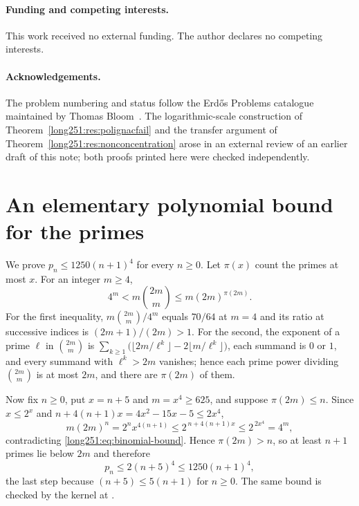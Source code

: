 \documentclass[11pt]{article}
\begin{document}
\paragraph{Funding and competing interests.} This work received no external
funding.  The author declares no competing interests.

\paragraph{Acknowledgements.} The problem numbering and status follow the
Erd\H{o}s Problems catalogue maintained by Thomas Bloom~\cite{erdosproblems}.
The logarithmic-scale construction of Theorem~\ref{long251:res:polignacfail} and the
transfer argument of Theorem~\ref{long251:res:nonconcentration} arose in an external
review of an earlier draft of this note; both proofs printed here were checked
independently.

\appendix
\section{An elementary polynomial bound for the primes}\label{long251:app:prime-bound}

We prove $p_n\le1250(n+1)^4$ for every $n\ge0$.  Let $\pi(x)$ count the primes
at most $x$.  For an integer $m\ge4$,
\begin{equation}\label{long251:eq:binomial-bound}
 4^m<m\binom{2m}{m}\le m(2m)^{\pi(2m)} .
\end{equation}
For the first inequality, $m\binom{2m}{m}/4^{m}$ equals $70/64$ at $m=4$ and
its ratio at successive indices is $(2m+1)/(2m)>1$.  For the second, the
exponent of a prime $\ell$ in $\binom{2m}{m}$ is
$\sum_{k\ge1}\bigl(\lfloor2m/\ell^{k}\rfloor-2\lfloor m/\ell^{k}\rfloor\bigr)$,
each summand is $0$ or $1$, and every summand with $\ell^{k}>2m$ vanishes;
hence each prime power dividing $\binom{2m}{m}$ is at most $2m$, and there are
$\pi(2m)$ of them.

Now fix $n\ge0$, put $x=n+5$ and $m=x^4\ge625$, and suppose $\pi(2m)\le n$.
Since $x\le2^{x}$ and $n+4(n+1)x=4x^2-15x-5\le2x^4$,
\[
 m(2m)^{n}=2^{n}x^{4(n+1)}
 \le2^{\,n+4(n+1)x}\le2^{\,2x^4}=4^{m},
\]
contradicting \eqref{long251:eq:binomial-bound}.  Hence $\pi(2m)>n$, so at least $n+1$
primes lie below $2m$ and therefore
\[
 p_n\le2(n+5)^4\le1250(n+1)^4 ,
\]
the last step because $(n+5)\le5(n+1)$ for $n\ge0$.  The same bound is checked
by the kernel at
.
\end{document}
